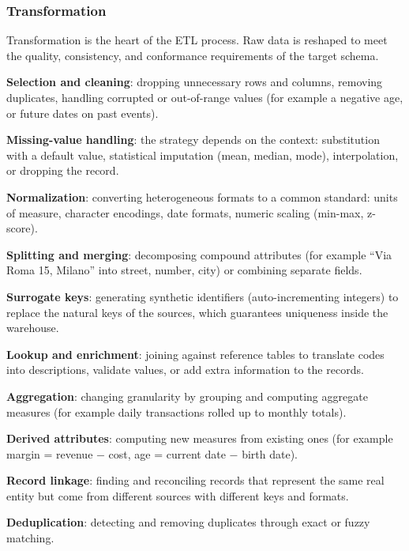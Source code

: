 \subsubsection{Transformation}
\label{subsec:transformation-phase}

Transformation is the heart of the ETL process. Raw data is reshaped to meet the quality, consistency, and conformance requirements of the target schema.

\begin{theorybox}[frametitle={Transformation operations}]
\textbf{Selection and cleaning}: dropping unnecessary rows and columns, removing duplicates, handling corrupted or out-of-range values (for example a negative age, or future dates on past events).

\textbf{Missing-value handling}: the strategy depends on the context: substitution with a default value, statistical imputation (mean, median, mode), interpolation, or dropping the record.

\textbf{Normalization}: converting heterogeneous formats to a common standard: units of measure, character encodings, date formats, numeric scaling (min-max, z-score).

\textbf{Splitting and merging}: decomposing compound attributes (for example ``Via Roma 15, Milano'' into street, number, city) or combining separate fields.

\textbf{Surrogate keys}: generating synthetic identifiers (auto-incrementing integers) to replace the natural keys of the sources, which guarantees uniqueness inside the warehouse.

\textbf{Lookup and enrichment}: joining against reference tables to translate codes into descriptions, validate values, or add extra information to the records.

\textbf{Aggregation}: changing granularity by grouping and computing aggregate measures (for example daily transactions rolled up to monthly totals).

\textbf{Derived attributes}: computing new measures from existing ones (for example margin = revenue $-$ cost, age = current date $-$ birth date).

\textbf{Record linkage}: finding and reconciling records that represent the same real entity but come from different sources with different keys and formats.

\textbf{Deduplication}: detecting and removing duplicates through exact or fuzzy matching.
\end{theorybox}

